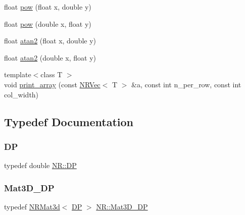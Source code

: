 \begin{DoxyCompactItemize}
\item 
float \mbox{\hyperlink{namespaceNR_a519f9a284cc5f48e57acafa04ad862df}{pow}} (float x, double y)
\item 
float \mbox{\hyperlink{namespaceNR_a7d26b090a44a3b527619df12b89923c9}{pow}} (double x, float y)
\item 
float \mbox{\hyperlink{namespaceNR_afbe2717cf898de31cf6e00b84bfc3e8f}{atan2}} (float x, double y)
\item 
float \mbox{\hyperlink{namespaceNR_a2f18cc48b4090d59c9cfdcb2ecc45e20}{atan2}} (double x, float y)
\item 
{\footnotesize template$<$class T $>$ }\\void \mbox{\hyperlink{namespaceNR_abdbf6d4f445b801d09e550474f942b00}{print\+\_\+array}} (const \mbox{\hyperlink{classNR_1_1NRVec}{N\+R\+Vec}}$<$ T $>$ \&a, const int n\+\_\+per\+\_\+row, const int col\+\_\+width)
\end{DoxyCompactItemize}


\subsection{Typedef Documentation}
\mbox{\label{namespaceNR_af6ff762dd605ff477b8e52387253a02a}} 
\subsubsection{\texorpdfstring{DP}{DP}}
{\footnotesize\ttfamily typedef double \mbox{\hyperlink{namespaceNR_af6ff762dd605ff477b8e52387253a02a}{N\+R\+::\+DP}}}

\mbox{\label{namespaceNR_a64c9c5cd3e465fce99c1068a62bbc9d3}} 
\subsubsection{\texorpdfstring{Mat3D\_DP}{Mat3D\_DP}}
{\footnotesize\ttfamily typedef \mbox{\hyperlink{classNR_1_1NRMat3d}{N\+R\+Mat3d}}$<$ \mbox{\hyperlink{namespaceNR_af6ff762dd605ff477b8e52387253a02a}{DP}} $>$ \mbox{\hyperlink{namespaceNR_a64c9c5cd3e465fce99c1068a62bbc9d3}{N\+R\+::\+Mat3\+D\+\_\+\+DP}}}

\mbox{\label{namespaceNR_a3cb7a4c8eb0a2a98a239a9a8200ec5d8}} 
